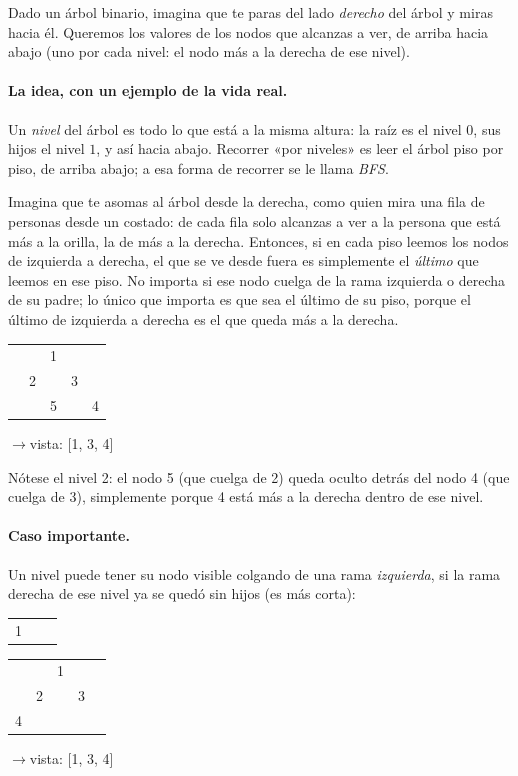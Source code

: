 
Dado un árbol binario, imagina que te paras del lado \emph{derecho} del
árbol y miras hacia él. Queremos los valores de los nodos que alcanzas a
ver, de arriba hacia abajo (uno por cada nivel: el nodo más a la derecha de
ese nivel).

\paragraph{La idea, con un ejemplo de la vida real.} Un \emph{nivel} del árbol
es todo lo que está a la misma altura: la raíz es el nivel $0$, sus hijos el
nivel $1$, y así hacia abajo. Recorrer «por niveles» es leer el árbol piso por
piso, de arriba abajo; a esa forma de recorrer se le llama \emph{BFS}.

Imagina que te asomas al árbol desde la derecha, como quien mira una fila de
personas desde un costado: de cada fila solo alcanzas a ver a la persona que está
más a la orilla, la de más a la derecha. Entonces, si en cada piso leemos los
nodos de izquierda a derecha, el que se ve desde fuera es simplemente el
\emph{último} que leemos en ese piso. No importa si ese nodo cuelga de la rama
izquierda o derecha de su padre; lo único que importa es que sea el último de su
piso, porque el último de izquierda a derecha es el que queda más a la derecha.

\begin{center}
\ttfamily
\begin{tabular}{ccccc}
 & & 1 & & \\
 & 2 & & 3 & \\
 & & 5 & & 4\\
\end{tabular}
\quad$\rightarrow$\quad vista: [1, 3, 4]
\end{center}

\noindent Nótese el nivel 2: el nodo 5 (que cuelga de 2) queda oculto
detrás del nodo 4 (que cuelga de 3), simplemente porque 4 está más a la
derecha dentro de ese nivel.

\paragraph{Caso importante.} Un nivel puede tener su nodo visible colgando
de una rama \emph{izquierda}, si la rama derecha de ese nivel ya se quedó
sin hijos (es más corta):

\begin{center}
\ttfamily
\begin{tabular}{ccc}
 1 & & \\
\end{tabular}
\quad
\begin{tabular}{ccccc}
 & & 1 & & \\
 & 2 & & 3 & \\
 4 & & & & \\
\end{tabular}
\quad$\rightarrow$\quad vista: [1, 3, 4]
\end{center}

